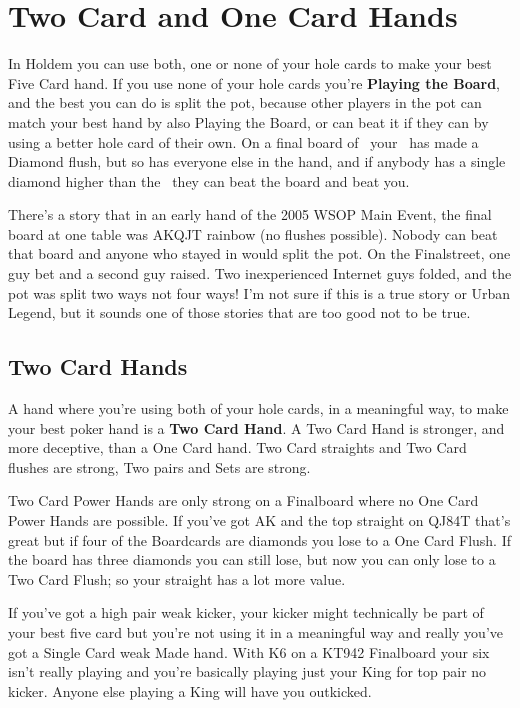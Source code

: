 \chapter{Two Card and One Card Hands}


In Holdem you can use both, one or none of your hole cards to make your
best Five Card hand. If you use none of your hole cards you're
\textbf{Playing the Board}, and the best you can do is split the
pot, because other players in the pot can match your best hand by also
Playing the Board, or can beat it if they can by using a better hole
card of their own. On a final board of \Ad\nined\eigd\Jd\sixd\ your
\Qc\Qs\ has made a Diamond flush, but so has everyone else in the hand,
and if anybody has a single diamond higher than the \sixd\ they can
beat the board and beat you.

There's a story that in an early hand of the 2005 WSOP Main Event,
the final board at one table was AKQJT rainbow (no flushes
possible). Nobody can beat that board and anyone who stayed in would
split the pot. On the Finalstreet, one guy bet and a second guy
raised. Two inexperienced Internet guys folded, and the pot was split
two ways not four ways! I'm not sure if this is a true story or Urban
Legend, but it sounds one of those stories that are too good not to be
true.

\section{Two Card Hands}

A hand where you're using both of your hole cards, in a meaningful
way, to make your best poker hand is a \textbf{Two Card
Hand}. A Two Card Hand is stronger, and more deceptive, than a
One Card hand. Two Card straights and Two Card flushes are
strong, Two pairs and Sets are strong.

Two Card Power Hands are only strong on a Finalboard where no
One Card Power Hands are possible. If you've got AK and the top
straight on QJ84T that's great but if four of the Boardcards are
diamonds you lose to a One Card Flush. If the board has three
diamonds you can still lose, but now you can only lose to a Two
Card Flush; so your straight has a lot more value.

If you've got a high pair weak kicker, your kicker might technically
be part of your best five card but you're not using it in a meaningful
way and really you've got a Single Card weak Made hand. With K6 on a
KT942 Finalboard your six isn't really playing and you're
basically playing just your King for top pair no kicker. Anyone else
playing a King will have you outkicked.

